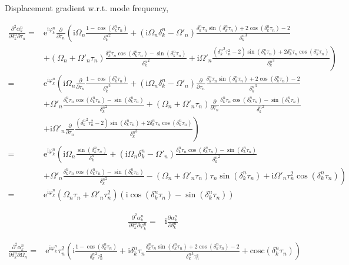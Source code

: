 \documentclass[10pt,fleqn]{article}
\newcommand{\ue}{\mathrm{e}}
\newcommand{\ui}{\mathrm{i}}
\newcommand{\eqar}[1]
{
  \begin{align*}
    #1
  \end{align*}
}
\newcommand{\paren}[1]{{\left({#1}\right)}}
\newcommand{\lparen}[1]{{\left({#1}\right.}}
\newcommand{\rparen}[1]{{\left.{#1}\right)}}
\newcommand{\pdiff}[3][{}]{{\frac{\partial^{#1} {#2}}{\partial {#3}{}^{#1}}}}
\begin{document}
Displacement gradient w.r.t. mode frequency,
\eqar{
  \frac{\partial^2\alpha_k^n}{\partial\delta_k^n\partial\tau_n}=&\ue^{\ui\varphi_k^n}\pdiff{}{\tau_n}\lparen{
    \ui\Omega_n\frac{1-\cos\paren{\delta_k^n\tau_n}}{{\delta_k^n}^2}
    +\paren{\ui\Omega_n\delta_k^n-\Omega'_n}
    \frac{\delta_k^n\tau_n\sin\paren{\delta_k^n\tau_n}+2\cos\paren{\delta_k^n\tau_n}-2}{{\delta_k^n}^3}
  }\\
  &\rparen{
    +\paren{\Omega_n+\Omega'_n\tau_n}
    \frac{{\delta_k^n\tau_n}\cos\paren{\delta_k^n\tau_n}-\sin\paren{\delta_k^n\tau_n}}{{\delta_k^n}^2}
    +\ui\Omega'_n
    \frac{\paren{{\delta_k^n}^2\tau_n^2-2}\sin\paren{\delta_k^n\tau_n}+2\delta_k^n\tau_n\cos\paren{\delta_k^n\tau_n}}{{\delta_k^n}^3}
  }\\
  =&\ue^{\ui\varphi_k^n}\lparen{
    \ui\Omega_n\pdiff{}{\tau_n}\frac{1-\cos\paren{\delta_k^n\tau_n}}{{\delta_k^n}^2}
    +\paren{\ui\Omega_n\delta_k^n-\Omega'_n}
    \pdiff{}{\tau_n}\frac{\delta_k^n\tau_n\sin\paren{\delta_k^n\tau_n}+2\cos\paren{\delta_k^n\tau_n}-2}{{\delta_k^n}^3}
  }\\
  &+\Omega'_n
  \frac{{\delta_k^n\tau_n}\cos\paren{\delta_k^n\tau_n}-\sin\paren{\delta_k^n\tau_n}}{{\delta_k^n}^2}
  +\paren{\Omega_n+\Omega'_n\tau_n}
  \pdiff{}{\tau_n}\frac{{\delta_k^n\tau_n}\cos\paren{\delta_k^n\tau_n}-\sin\paren{\delta_k^n\tau_n}}{{\delta_k^n}^2}
  \\
  &\rparen{
    +\ui\Omega'_n
    \pdiff{}{\tau_n}\frac{\paren{{\delta_k^n}^2\tau_n^2-2}\sin\paren{\delta_k^n\tau_n}+2\delta_k^n\tau_n\cos\paren{\delta_k^n\tau_n}}{{\delta_k^n}^3}
  }\\
  =&\ue^{\ui\varphi_k^n}\lparen{
    \ui\Omega_n\frac{\sin\paren{\delta_k^n\tau_n}}{{\delta_k^n}}
    +\paren{\ui\Omega_n\delta_k^n-\Omega'_n}
    \frac{
      {\delta_k^n}\tau_n\cos\paren{\delta_k^n\tau_n}
      -\sin\paren{\delta_k^n\tau_n}}{{\delta_k^n}^2}
  }\\
  &\rparen{
    +\Omega'_n
    \frac{{\delta_k^n\tau_n}\cos\paren{\delta_k^n\tau_n}-\sin\paren{\delta_k^n\tau_n}}{{\delta_k^n}^2}
    -\paren{\Omega_n+\Omega'_n\tau_n}\tau_n\sin\paren{\delta_k^n\tau_n}
    +\ui\Omega'_n\tau_n^2\cos\paren{\delta_k^n\tau_n}
  }\\
  =&\ue^{\ui\varphi_k^n}\paren{\Omega_n\tau_n+\Omega'_n\tau_n^2}\paren{
    \ui\cos\paren{\delta_k^n\tau_n}-\sin\paren{\delta_k^n\tau_n}
  }
}
\eqar{
  \frac{\partial^2\alpha_k^n}{\partial\delta_k^n\partial\varphi_k^n}=&\ui\pdiff{\alpha_k^n}{\delta_k^n}
}
\eqar{
  \frac{\partial^2\alpha_k^n}{\partial\delta_k^n\partial\Omega_n}=&\ue^{\ui\varphi_k^n}\tau_n^2\paren{
    \ui\frac{1-\cos\paren{\delta_k^n\tau_n}}{{\delta_k^n}^2\tau_n^2}
    +\ui\delta_k^n\tau_n
    \frac{\delta_k^n\tau_n\sin\paren{\delta_k^n\tau_n}+2\cos\paren{\delta_k^n\tau_n}-2}{{\delta_k^n}^3\tau_n^3}+\mathrm{cosc}\paren{\delta_k^n\tau_n}
  }
}
\end{document}

